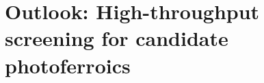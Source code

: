 \documentclass[11pt, twoside]{report}
\begin{document}







\section{Outlook: High-throughput screening for candidate photoferroics}

\end{document}

